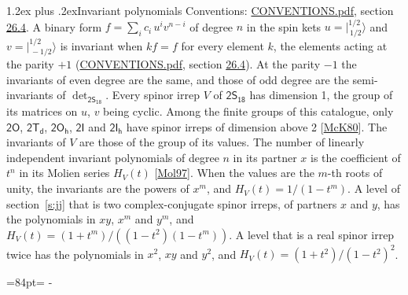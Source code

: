 \documentclass[10pt,a4paper]{article}
\makeatletter
\renewcommand\section{\@startsection{section}{1}{\z@}{-3ex plus -1ex minus -.2ex}%
  {1.2ex plus .2ex}{\normalfont\large\sffamily\bfseries\color{parttitle}}}
\newcommand{\needspace}[1]{\par\penalty-100\begingroup\dimen0=#1\relax\dimen2=\pagegoal
  \advance\dimen2-\pagetotal\ifdim\dimen0>\dimen2\relax\ifdim\dimen2>0pt\vfil\break\fi\fi
  \endgroup}
\numberwithin{equation}{section}
\newcommand{\grp}[1]{\mathsf{#1}}
\newcommand{\jm}[2]{\bigl\lvert{}^{#1}_{\,#2}\bigr\rangle}
\makeatother
\begin{document}
\section{Invariant polynomials}\label{s:invariants}
Conventions: \href{../../CONVENTIONS.pdf}{CONVENTIONS.pdf}, section \href{../../CONVENTIONS.pdf\#conv.26.4}{26.4}.
\leavevmode\label{n:local.binary.form}A binary form $f = \sum_i c_i\, u^i v^{n-i}$ of degree $n$ in the spin kets $u = \jm{1/2}{1/2}$ and $v = \jm{1/2}{-1/2}$ is invariant when $k f = f$ for every element $k$, the elements acting at the parity $+1$ (\href{../../CONVENTIONS.pdf}{CONVENTIONS.pdf}, section \href{../../CONVENTIONS.pdf\#conv.26.4}{26.4}). At the parity $-1$ the invariants of even degree are the same, and those of odd degree are the semi-invariants of $\det_{\grp{2S_{18}}}$.
\leavevmode\label{n:function.hilbert}Every spinor irrep $V$ of $\grp{2S_{18}}$ has dimension 1, the group of its matrices on $u$, $v$ being cyclic. Among the finite groups of this catalogue, only $\grp{2O}$, $\grp{2T_{d}}$, $\grp{2O_{h}}$, $\grp{2I}$ and $\grp{2I_{h}}$ have spinor irreps of dimension above 2 [\href{../../../REFERENCES.pdf\#ref.McK80}{McK80}]. The invariants of $V$ are those of the group of its values. \label{n:local.partner.x}The number of linearly independent invariant polynomials of degree $n$ in its partner $x$ is the coefficient of $t^n$ in its Molien series $H_V(t)$ [\href{../../../REFERENCES.pdf\#ref.Mol97}{Mol97}]. When the values are the $m$-th roots of unity, the invariants are the powers of $x^{m}$, and $H_V(t) = 1/(1 - t^{m})$. A level of section~\ref{s:jj} that is two complex-conjugate spinor irreps, of partners $x$ and $y$, has the polynomials in $xy$, $x^{m}$ and $y^{m}$, and $H_V(t) = (1 + t^{m})/((1 - t^{2})(1 - t^{m}))$. A level that is a real spinor irrep twice has the polynomials in $x^{2}$, $xy$ and $y^{2}$, and $H_V(t) = (1 + t^{2})/(1 - t^{2})^{2}$.
\needspace{84pt}
\end{document}
